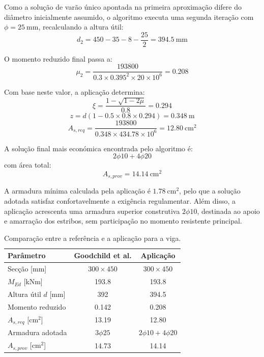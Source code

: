 Como a solução de varão único apontada na primeira aproximação difere do diâmetro inicialmente assumido, o algoritmo executa uma segunda iteração com \(\phi = 25\ \text{mm}\), recalculando a altura útil:
\begin{equation}
d_2 = 450 - 35 - 8 - \frac{25}{2} = 394.5\ \text{mm}
\end{equation}

O momento reduzido final passa a:
\begin{equation}
\mu_2 =
\frac{193800}{0.3 \times 0.395^2 \times 20\times 10^6}
= 0.208
\end{equation}

Com base neste valor, a aplicação determina:
\begin{equation}
\xi = \frac{1-\sqrt{1-2\mu}}{0.8} = 0.294
\end{equation}
\begin{equation}
z = d(1-0.5\times 0.8 \times 0.294) = 0.348\ \text{m}
\end{equation}
\begin{equation}
A_{s,req} =
\frac{193800}{0.348 \times 434.78\times 10^6}
= 12.80\ \text{cm}^2
\end{equation}

A solução final mais económica encontrada pelo algoritmo é:
\begin{equation}
2\phi10 + 4\phi20
\end{equation}
com área total:
\begin{equation}
A_{s,prov} = 14.14\ \text{cm}^2
\end{equation}

A armadura mínima calculada pela aplicação é \(1.78\ \text{cm}^2\), pelo que a solução adotada satisfaz confortavelmente a exigência regulamentar. Além disso, a aplicação acrescenta uma armadura superior construtiva \(2\phi10\), destinada ao apoio e amarração dos estribos, sem participação no momento resistente principal.

\begin{table}[H]
\centering
\caption{Comparação entre a referência e a aplicação para a viga.}
\label{tab:comp_viga}
\renewcommand{\arraystretch}{1.2}
\begin{tabular}{lcc}
\toprule
\textbf{Parâmetro} & \textbf{Goodchild et al.} & \textbf{Aplicação} \\
\midrule
Secção [mm] & \(300 \times 450\) & \(300 \times 450\) \\
\(M_{Ed}\) [kNm] & 193.8 & 193.8 \\
Altura útil \(d\) [mm] & 392 & 394.5 \\
Momento reduzido & 0.142 & 0.208 \\
\(A_{s,req}\) [cm\(^2\)] & 13.19 & 12.80 \\
Armadura adotada & \(3\phi25\) & \(2\phi10 + 4\phi20\) \\
\(A_{s,prov}\) [cm\(^2\)] & 14.73 & 14.14 \\
\bottomrule
\end{tabular}
\end{table}

